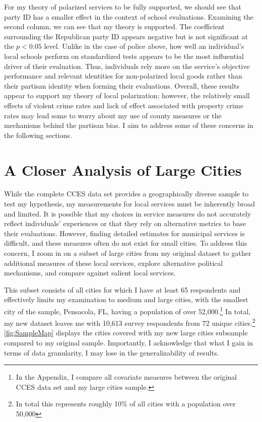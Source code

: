 For my theory of polarized services to be fully supported, we should see that party ID has a smaller effect in the context of school evaluations. Examining the second column, we can see that my theory is supported. The coefficient surrounding the Republican party ID appears negative but is not significant at the $p<0.05$ level. Unlike in the case of police above, how well an individual’s local schools perform on standardized tests appears to be the most influential driver of their evaluation. Thus, individuals rely more on the service’s objective performance and relevant identities for non-polarized local goods rather than their partisan identity when forming their evaluations. Overall, these results appear to support my theory of local polarization; however, the relatively small effects of violent crime rates and lack of effect associated with property crime rates may lead some to worry about my use of county measures or the mechanisms behind the partisan bias. I aim to address some of these concerns in the following sections. 


\section{A Closer Analysis of Large Cities}

While the complete CCES data set provides a geographically diverse sample to test my hypothesis, my measurements for local services must be inherently broad and limited. It is possible that my choices in service measures do not accurately reflect individuals’ experiences or that they rely on alternative metrics to base their evaluations. However, finding detailed estimates for municipal services is difficult, and these measures often do not exist for small cities. To address this concern, I zoom in on a subset of large cities from my original dataset to gather additional measures of these local services, explore alternative political mechanisms, and compare against salient local services.

This subset consists of all cities for which I have at least 65 respondents and effectively limits my examination to medium and large cities, with the smallest city of the sample, Pensacola, FL, having a population of over 52,000.\footnote{In the Appendix, I compare all covariate measures between the original CCES data set and my large cities sample.} In total, my new dataset leaves me with 10,613 survey respondents from 72 unique cities.\footnote{In total this represents roughly 10\% of all cities with a population over 50,000} \autoref{fig:SampleMap} displays the cities covered with my new large cities subsample compared to my original sample. Importantly, I acknowledge that what I gain in terms of data granularity, I may lose in the generalizability of results.

